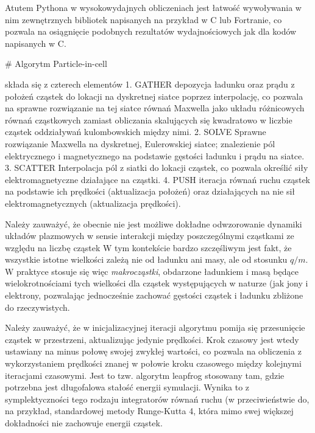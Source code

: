 Atutem Pythona w wysokowydajnych obliczeniach jest łatwość wywoływania w nim zewnętrznych bibliotek napisanych
na przykład w C lub Fortranie, co pozwala na osiągnięcie podobnych rezultatów wydajnościowych jak dla kodów
napisanych w C.

# Algorytm Particle-in-cell

składa się z czterech elementów %
1. GATHER
depozycja ładunku oraz prądu z położeń cząstek do lokacji na dyskretnej siatce poprzez interpolację,
co pozwala na sprawne rozwiązanie na tej siatce
równań Maxwella jako układu różnicowych równań cząstkowych zamiast obliczania skalujących się kwadratowo w liczbie cząstek
oddziaływań kulombowskich między nimi.
2. SOLVE
Sprawne rozwiązanie Maxwella na dyskretnej, Eulerowskiej siatce; znalezienie pól elektrycznego i magnetycznego
na podstawie gęstości ładunku i prądu na siatce. 
3. SCATTER
Interpolacja pól z siatki do lokacji cząstek, co pozwala określić siły elektromagnetyczne działające na cząstki.
4. PUSH
iteracja równań ruchu cząstek na podstawie ich prędkości (aktualizacja położeń)
oraz działających na nie sił elektromagnetycznych (aktualizacja prędkości).

Należy zauważyć, że obecnie nie jest możliwe dokładne odwzorowanie dynamiki układów plazmowych w sensie interakcji
między poszczególnymi cząstkami ze względu na liczbę cząstek %
W tym kontekście bardzo szczęśliwym jest fakt, że wszystkie istotne wielkości zależą nie od ładunku ani masy,
ale od stosunku $q/m$. W praktyce stosuje się więc \emph{makrocząstki}, obdarzone ładunkiem i masą będące wielokrotnościami
tych wielkości dla cząstek występujących w naturze (jak jony i elektrony, pozwalając jednocześnie zachować gęstości
cząstek i ładunku %
zbliżone do rzeczywistych.

Należy zauważyć, że w inicjalizacyjnej iteracji algorytmu pomija się przesunięcie cząstek w przestrzeni, aktualizując jedynie
prędkości. Krok czasowy jest wtedy ustawiany na minus połowę swojej zwykłej wartości, co pozwala na obliczenia
z wykorzystaniem prędkości znanej w połowie kroku czasowego między kolejnymi iteracjami czasowymi. Jest to tzw. algorytm
leapfrog %
stosowany tam, gdzie potrzebna jest długofalowa stałość energii symulacji. Wynika to z symplektyczności %
tego rodzaju integratorów równań ruchu (w przeciwieństwie do, na przykład, standardowej metody Runge-Kutta 4, która
mimo swej większej dokładności nie zachowuje energii cząstek.

